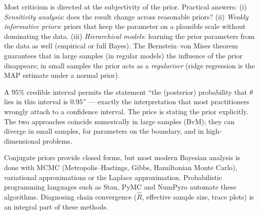 \documentclass[main.tex]{subfiles}
\begin{document}
\begin{remark}
Most criticism is directed at the subjectivity of the prior. Practical answers: (i) \emph{Sensitivity analysis}: does the result change across reasonable priors? (ii) \emph{Weakly informative priors}: priors that keep the parameter on a plausible scale without dominating the data. (iii) \emph{Hierarchical models}: learning the prior parameters from the data as well (empirical or full Bayes). The Bernstein--von Mises theorem guarantees that in large samples (in regular models) the influence of the prior disappears; in small samples the prior acts as a \emph{regulariser} (ridge regression is the MAP estimate under a normal prior).
\end{remark}

\begin{remark}
A $95\%$ credible interval permits the statement ``the (posterior) probability that $\theta$ lies in this interval is $0.95$'' --- exactly the interpretation that most practitioners wrongly attach to a confidence interval. The price is stating the prior explicitly. The two approaches coincide numerically in large samples (BvM); they can diverge in small samples, for parameters on the boundary, and in high-dimensional problems.
\end{remark}

\begin{remark}[Computation]
Conjugate priors provide closed forms, but most modern Bayesian analysis is done with MCMC (Metropolis--Hastings, Gibbs, Hamiltonian Monte Carlo), variational approximations or the Laplace approximation. Probabilistic programming languages such as Stan, PyMC and NumPyro automate these algorithms. Diagnosing chain convergence ($\hat R$, effective sample size, trace plots) is an integral part of these methods.
\end{remark}

\end{document}
